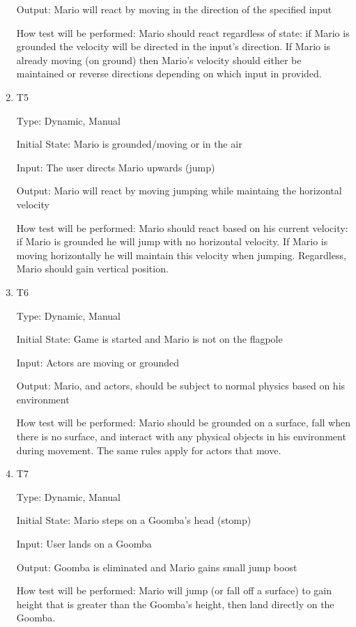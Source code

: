 \documentclass[12pt, titlepage]{article}
\begin{document}
\begin{enumerate}
Output: Mario will react by moving in the direction of the specified input
					
How test will be performed: Mario should react regardless of state: if Mario is grounded the velocity will be directed in the input's direction. If Mario is already moving (on ground) then Mario's velocity should either be maintained or reverse directions depending on which input in provided.

\item{T5\\}

Type: Dynamic, Manual
					
Initial State: Mario is grounded/moving or in the air
					
Input: The user directs Mario upwards (jump)
					
Output: Mario will react by moving jumping while maintaing the horizontal velocity
					
How test will be performed: Mario should react based on his current velocity: if Mario is grounded he will jump with no horizontal velocity. If Mario is moving horizontally he will maintain this velocity when jumping. Regardless, Mario should gain vertical position.

\item{T6\\}

Type: Dynamic, Manual
					
Initial State: Game is started and Mario is not on the flagpole
					
Input: Actors are moving or grounded
					
Output: Mario, and actors, should be subject to normal physics based on his environment
					
How test will be performed: Mario should be grounded on a surface, fall when there is no surface, and interact with any physical objects in his environment during movement. The same rules apply for actors that move.

\item{T7\\}

Type: Dynamic, Manual
					
Initial State: Mario steps on a Goomba's head (stomp) 
					
Input: User lands on a Goomba
					
Output: Goomba is eliminated and Mario gains small jump boost
					
How test will be performed: Mario will jump (or fall off a surface) to gain height that is greater than the Goomba's height, then land directly on the Goomba.


\end{enumerate}
\end{document}
